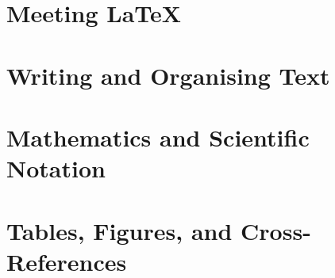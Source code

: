 \documentclass[11pt,openany]{book}
\begin{document}
\hypersetup{pageanchor=false}
\pagestyle{empty}





\frontmatter
\hypersetup{pageanchor=true}
\pagestyle{plain}







\tableofcontents

\mainmatter
\pagestyle{bookstyle}

\setcounter{chapter}{-1}
\cleardoublepage
\part{Meeting \LaTeX{}}







\cleardoublepage
\part{Writing and Organising Text}







\cleardoublepage
\part{Mathematics and Scientific Notation}







\cleardoublepage
\part{Tables, Figures, and Cross-References}






\end{document}
